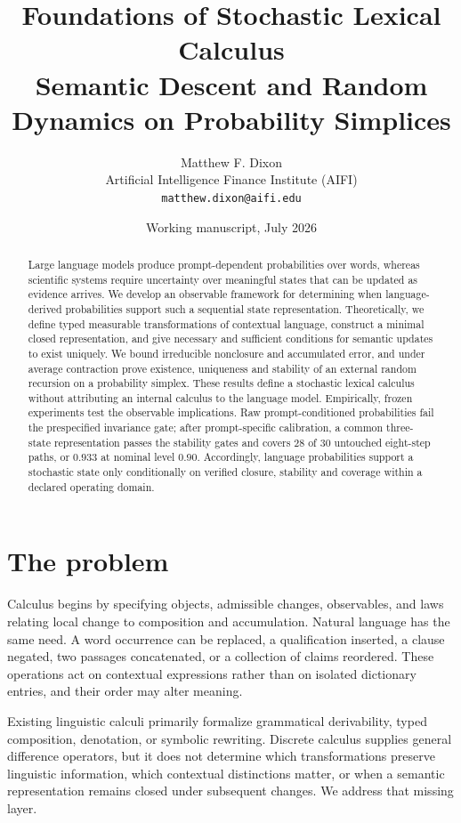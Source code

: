 \documentclass[11pt]{article}
\title{Foundations of Stochastic Lexical Calculus\\
\large Semantic Descent and Random Dynamics on Probability Simplices}
\author{Matthew F. Dixon\\Artificial Intelligence Finance Institute (AIFI)\\
\texttt{matthew.dixon@aifi.edu}}
\date{Working manuscript, July 2026}
\begin{document}
\maketitle

\begin{abstract}
Large language models produce prompt-dependent probabilities over words,
whereas scientific systems require uncertainty over meaningful states that
can be updated as evidence arrives.  We develop an observable framework for
determining when language-derived probabilities support such a sequential
state representation.  Theoretically, we define typed measurable
transformations of contextual language, construct a minimal closed
representation, and give necessary and sufficient conditions for semantic
updates to exist uniquely.  We bound irreducible nonclosure and accumulated
error, and under average contraction prove existence, uniqueness and
stability of an external random recursion on a probability simplex.  These
results define a stochastic lexical calculus without attributing an internal
calculus to the language model.  Empirically, frozen experiments test the
observable implications.  Raw prompt-conditioned probabilities fail the
prespecified invariance gate; after prompt-specific calibration, a common
three-state representation passes the stability gates and covers $28$ of
$30$ untouched eight-step paths, or $0.933$ at nominal level $0.90$.
Accordingly, language probabilities support a stochastic state only
conditionally on verified closure, stability and coverage within a declared
operating domain.
\end{abstract}

\section{The problem}
Calculus begins by specifying objects, admissible changes, observables, and laws relating local change to composition and accumulation. Natural language has the same need. A word occurrence can be replaced, a qualification inserted, a clause negated, two passages concatenated, or a collection of claims reordered. These operations act on contextual expressions rather than on isolated dictionary entries, and their order may alter meaning.

Existing linguistic calculi primarily formalize grammatical derivability, typed composition, denotation, or symbolic rewriting. Discrete calculus supplies general difference operators, but it does not determine which transformations preserve linguistic information, which contextual distinctions matter, or when a semantic representation remains closed under subsequent changes. We address that missing layer.
\end{document}
